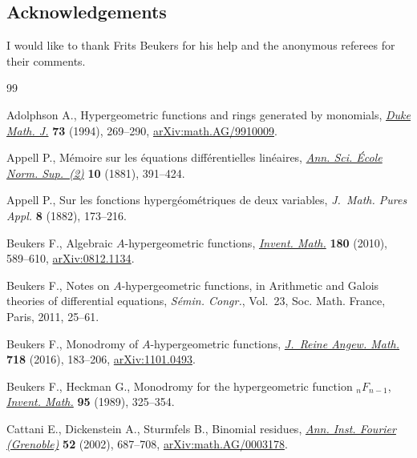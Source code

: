 \documentclass[pdftex]{sigma}
\numberwithin{equation}{section}
\begin{document}
\subsection*{Acknowledgements}

I would like to thank Frits Beukers for his help and the anonymous referees for their comments.

\begin{thebibliography}{99}
\footnotesize\itemsep=0pt

Adolphson A., Hypergeometric functions and rings generated by monomials,
 \href{https://doi.org/10.1215/S0012-7094-94-07313-4}{\textit{Duke Math. J.}} \textbf{73} (1994), 269--290,
 \href{https://arxiv.org/abs/math.AG/9910009}{arXiv:math.AG/9910009}.

Appell P., M\'emoire sur les \'equations diff\'erentielles lin\'eaires,
 \href{https://doi.org/10.24033/asens.206}{\textit{Ann. Sci. \'{E}cole Norm. Sup.~(2)}} \textbf{10} (1881), 391--424.

Appell P., Sur les fonctions hyperg\'eom\'etriques de deux variables,
 \textit{J.~Math. Pures Appl.} \textbf{8} (1882), 173--216.

Beukers F., Algebraic {$A$}-hypergeometric functions, \href{https://doi.org/10.1007/s00222-010-0238-y}{\textit{Invent. Math.}}
 \textbf{180} (2010), 589--610, \href{https://arxiv.org/abs/0812.1134}{arXiv:0812.1134}.

Beukers F., Notes on {$A$}-hypergeometric functions, in Arithmetic and {G}alois
 theories of differential equations, \textit{S\'emin. Congr.}, Vol.~23, Soc.
 Math. France, Paris, 2011, 25--61.

Beukers F., Monodromy of {$A$}-hypergeometric functions, \href{https://doi.org/10.1515/crelle-2014-0054}{\textit{J.~Reine
 Angew. Math.}} \textbf{718} (2016), 183--206, \href{https://arxiv.org/abs/1101.0493}{arXiv:1101.0493}.

Beukers F., Heckman G., Monodromy for the hypergeometric function
 {$_nF_{n-1}$}, \href{https://doi.org/10.1007/BF01393900}{\textit{Invent. Math.}} \textbf{95} (1989), 325--354.

Cattani E., Dickenstein A., Sturmfels B., Binomial residues, \href{https://doi.org/10.5802/aif.1898}{\textit{Ann. Inst.
 Fourier (Grenoble)}} \textbf{52} (2002), 687--708, \href{https://arxiv.org/abs/math.AG/0003178}{arXiv:math.AG/0003178}.


\end{thebibliography}
\end{document}
